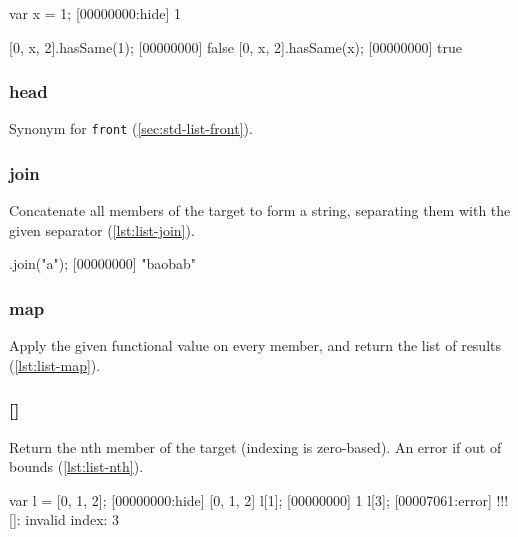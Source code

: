 \begin{urbiscript}[caption=List.hasSame, label=lst:list-hasSame]
var x = 1;
[00000000:hide] 1

[0, x, 2].hasSame(1);
[00000000] false
[0, x, 2].hasSame(x);
[00000000] true
\end{urbiscript}

\subsubsection{head}

Synonym for \lstinline|front| (\autoref{sec:std-list-front}).

\subsubsection{join}

Concatenate all members of the target to form a string, separating
them with the given separator (\autoref{lst:list-join}).

\begin{urbiscript}[caption=List.join, label=lst:list-join]
["b", "ob", "b"].join("a");
[00000000] "baobab"
\end{urbiscript}

\subsubsection{map}

Apply the given functional value on every member, and return the list
of results (\autoref{lst:list-map}).


\subsubsection{[]}
\label{sec:std-list-nth}

Return the nth member of the target (indexing is zero-based). An error
if out of bounds (\autoref{lst:list-nth}).

\begin{urbiscript}[caption={List}, label=lst:list-nth]
var l = [0, 1, 2];
[00000000:hide] [0, 1, 2]
l[1];
[00000000] 1
l[3];
[00007061:error] !!! []: invalid index: 3
\end{urbiscript}

